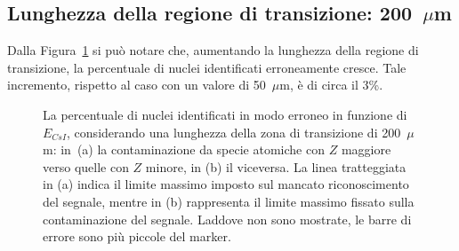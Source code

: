 \subsection*{Lunghezza della regione di transizione: 200~$\mu$m}

Dalla Figura~\ref{fig:leakage_res_200um} si può notare che, aumentando la lunghezza della regione di transizione, la percentuale di nuclei identificati erroneamente cresce.
Tale incremento, rispetto al caso con un valore di 50~$\mu$m, è di circa il 3\%.



\begin{figure}[!p] 
	\centering
	\hspace{10mm}
	\caption{La percentuale di nuclei identificati in modo erroneo in funzione di $E_{CsI}$, considerando una lunghezza della zona di transizione di 200~$\mu$m: in~(a) la contaminazione da specie atomiche con $Z$ maggiore verso quelle con $Z$ minore, in (b) il viceversa. La linea tratteggiata in (a) indica il limite massimo imposto sul mancato riconoscimento del segnale, mentre in (b) rappresenta il limite massimo fissato sulla contaminazione del segnale. Laddove non sono mostrate, le barre di errore sono più piccole del marker.} \label{fig:leakage_res_200um}
\end{figure}



